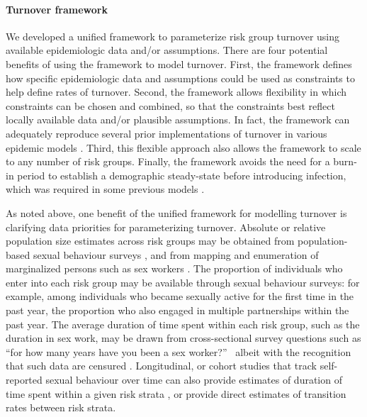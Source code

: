 \paragraph{Turnover framework}
We developed a unified framework
to parameterize risk group turnover
using available epidemiologic data and/or assumptions.
There are four potential benefits of using the framework to model turnover.
First, the framework defines how specific epidemiologic data and assumptions
could be used as constraints to help define rates of turnover.
Second, the framework allows flexibility in which constraints can be chosen and combined,
so that the constraints best reflect locally available data and/or plausible assumptions.
In fact, the framework can adequately reproduce
several prior implementations of turnover
in various epidemic models \citep{Stigum1994,Eaton2014,Henry2015}.
Third, this flexible approach also allows the framework to scale
to any number of risk groups.
Finally, the framework avoids the need for a burn-in period
to establish a demographic steady-state before introducing infection,
which was required in some previous models \citep{Boily2015}.
\par
As noted above, one benefit of the unified framework for modelling turnover
is clarifying data priorities for parameterizing turnover.
Absolute or relative population size estimates across risk groups
may be obtained from population-based sexual behaviour surveys \citep{DHS},
and from mapping and enumeration of marginalized persons
such as sex workers \citep{Abdul-Quader2014}.
The proportion of individuals who enter into each risk group
may be available through sexual behaviour surveys:
for example, among individuals who became sexually active for the first time in the past year,
the proportion who also engaged in multiple partnerships within the past year.
The average duration of time spent within each risk group, such as
the duration in sex work, may be drawn from
cross-sectional survey questions such as
``for how many years have you been a sex worker?''\ %
albeit with the recognition that such data are censured \citep{Watts2010}.
Longitudinal, or cohort studies that track
self-reported sexual behaviour over time can also provide
estimates of duration of time spent within a given risk strata \citep{Fergus2007},
or provide direct estimates of transition rates between risk strata.
